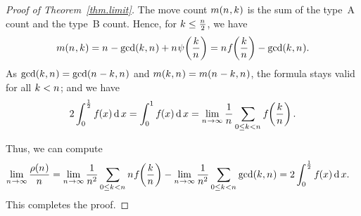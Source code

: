   \begin{proof}[Proof of Theorem~\ref{thm.limit}]
    The move count $m(n_{},k_{})$ is the sum of the type~A
    count and the type~B count. Hence, for
    $k_{}\leq\frac{n_{}}{2}$, we have 
    \begin{equation}\label{relation}
      \MovesOf{\Size}{\Shift}
      = \Size - \gcd(\Shift,\Size) + \Size\EssentialCostOf{\frac{\Shift}{\Size}}
      = \Size\RelCostOf{\frac{\Shift}{\Size}} - \gcd(\Shift,\Size)
      .
    \end{equation}
    As $\gcd(k_{},n_{}) = \gcd(n_{}-k_{},n_{})$ and
    $m(k_{},n_{})=m(n_{}-k_{},n_{})$, the formula stays valid for
    all $k_{}<n_{}$; and we have
    \[
      2
      \int_0^{\frac12} \RelCostOf{\TheVariable} \diff \TheVariable
      =
      \int_0^1 \RelCostOf{\TheVariable} \diff \TheVariable
      =
      \lim_{\Size\rightarrow\infty} \frac{1}{\Size}
      \sum_{0\leq\Shift<\Size} \RelCostOf{\frac{\Shift}{\Size}}
      .
    \]
    
    Thus, we can compute
    \begin{align*}
      \lim_{\Size\rightarrow\infty} \frac{\AvgCostOf{\Size}}{\Size}
      & =
        \lim_{\Size\rightarrow\infty}
        \frac{1}{\Size^2}
        \sum_{0\leq\Shift<\Size}\Size\RelCostOf{\frac{\Shift}{\Size}}
        -
        \lim_{\Size\rightarrow\infty} \frac{1}{\Size^2}
        \sum_{0\leq\Shift<\Size}\gcd(\Shift,\Size)      
       =
        2 \int_0^{\frac12} \RelCostOf{\TheVariable} \diff\TheVariable
        .
    \end{align*}
    This completes the proof.
  \end{proof}

